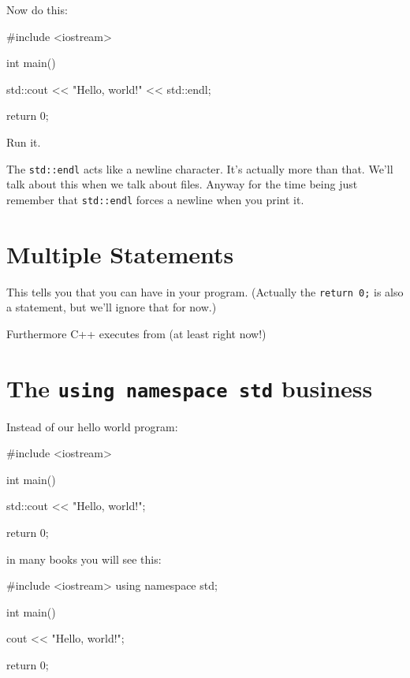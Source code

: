Now do this:
\begin{console}
#include <iostream>

int main()
{
    std::cout << "Hello, world!" << std::endl;

    return 0;
}
\end{console}
Run it.

The \verb!std::endl! acts like a newline character. 
It's actually more than that. 
We'll talk about this when we talk about files. 
Anyway for the time being just remember that 
\verb!std::endl! forces a newline when you print it.










\newpage\section{Multiple Statements}



This tells you that you can have 
in your program. (Actually the \verb!return 0;! is also a statement, but we'll ignore that for now.)

Furthermore C++ executes from 
(at least right now!)









\newpage\section{The \texttt{using namespace std} business}

Instead of our hello world program:
\begin{console}
#include <iostream>

int main()
{
    std::cout << "Hello, world!\n";

    return 0;
}
\end{console}
in many books you will see this:
\begin{console}
#include <iostream>
using namespace std;

int main()
{
    cout << "Hello, world!\n";

    return 0;
}
\end{console}


